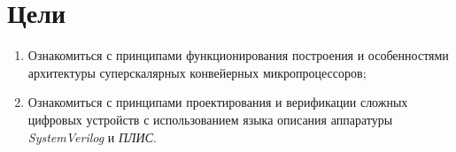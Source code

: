 \chapter{Цели}
\begin{enumerate}
    \item 
Ознакомиться с принципами функционирования построения и особенностями архитектуры суперскалярных конвейерных микропроцессоров;
    \item 
Ознакомиться с принципами проектирования и верификации сложных цифровых устройств с использованием языка описания аппаратуры \textit{SystemVerilog} и \textit{ПЛИС}.
\end{enumerate}